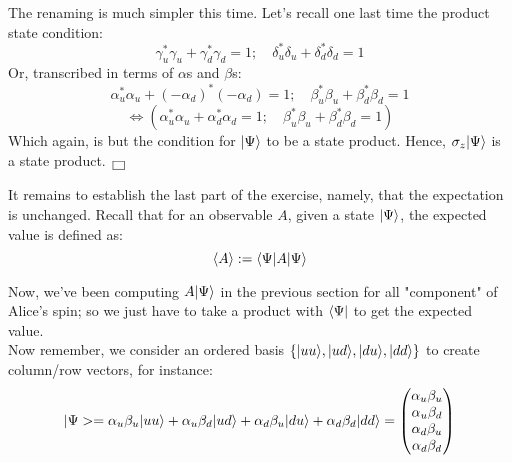\documentclass[solutions.tex]{subfiles}
\begin{document}
The renaming is much simpler this time. Let's recall one last time
the product state condition:
\[
	\gamma_u^*\gamma_u + \gamma_d^*\gamma_d = 1;\quad
	\delta_u^*\delta_u + \delta_d^*\delta_d = 1
\]
Or, transcribed in terms of $\alpha$s and $\beta$s:
\[
	\alpha_u^*\alpha_u + (-\alpha_d)^*(-\alpha_d) = 1; \quad
	\beta_u^*\beta_u + \beta_d^*\beta_d = 1
\]
\[
	\Leftrightarrow\left(
		\alpha_u^*\alpha_u + \alpha_d^*\alpha_d = 1; \quad
		\beta_u^*\beta_u + \beta_d^*\beta_d = 1
	\right)
\]
Which again, is but the condition for $\ket{\Psi}$ to be a state
product. Hence, $\sigma_z\ket{\Psi}$ is a state product. $\qed$

\hr

It remains to establish the last part of the exercise, namely, that the
expectation is unchanged. Recall that for an observable $A$, given a
state $\ket{\Psi}$, the expected value is defined as:
\[
	\avg{A} := \bra{\Psi}A\ket{\Psi}
\]

Now, we've been computing $A\ket{\Psi}$ in the previous section
for all "component" of Alice's spin; so we just have to take
a product with $\bra{\Psi}$ to get the expected value. \\

Now remember, we consider an ordered basis $\{\ket{uu}, \ket{ud},
\ket{du}, \ket{dd}\}$ to create column/row vectors, for instance:
\[
	|\Psi> = \alpha_u\beta_u\ket{uu} + \alpha_u\beta_d\ket{ud}
		+ \alpha_d\beta_u\ket{du} + \alpha_d\beta_d\ket{dd} =
	\begin{pmatrix}
		\alpha_u\beta_u \\
		\alpha_u\beta_d \\
		\alpha_d\beta_u \\
		\alpha_d\beta_d \\
	\end{pmatrix}
\]
\end{document}
